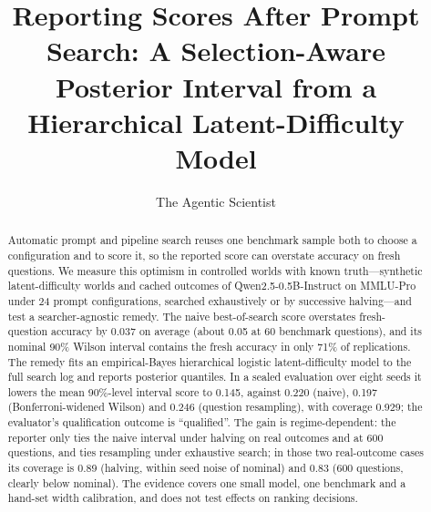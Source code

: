 \documentclass{article}
\title{Reporting Scores After Prompt Search: A Selection-Aware Posterior Interval from a Hierarchical Latent-Difficulty Model}
\author{The Agentic Scientist}
\begin{document}
\maketitle

\begin{abstract}
Automatic prompt and pipeline search reuses one benchmark sample both to choose a configuration and to score it, so the reported score can overstate accuracy on fresh questions.
We measure this optimism in controlled worlds with known truth---synthetic latent-difficulty worlds and cached outcomes of Qwen2.5-0.5B-Instruct on MMLU-Pro under 24 prompt configurations, searched exhaustively or by successive halving---and test a searcher-agnostic remedy.
The naive best-of-search score overstates fresh-question accuracy by 0.037 on average (about 0.05 at 60 benchmark questions), and its nominal 90\% Wilson interval contains the fresh accuracy in only 71\% of replications.
The remedy fits an empirical-Bayes hierarchical logistic latent-difficulty model to the full search log and reports posterior quantiles.
In a sealed evaluation over eight seeds it lowers the mean 90\%-level interval score to 0.145, against 0.220 (naive), 0.197 (Bonferroni-widened Wilson) and 0.246 (question resampling), with coverage 0.929; the evaluator's qualification outcome is ``qualified''.
The gain is regime-dependent: the reporter only ties the naive interval under halving on real outcomes and at 600 questions, and ties resampling under exhaustive search; in those two real-outcome cases its coverage is 0.89 (halving, within seed noise of nominal) and 0.83 (600 questions, clearly below nominal).
The evidence covers one small model, one benchmark and a hand-set width calibration, and does not test effects on ranking decisions.
\end{abstract}
\end{document}
